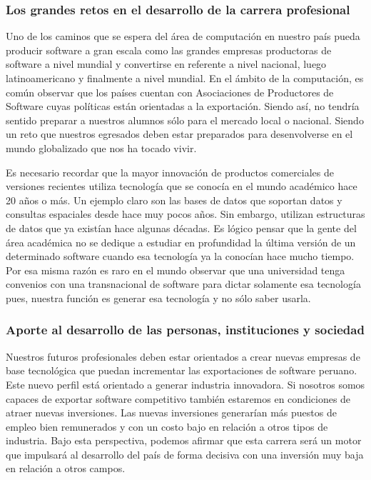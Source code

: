 \subsubsection{Los grandes retos en el desarrollo de la carrera profesional}
Uno de los caminos que se espera del área de computación en nuestro paí­s pueda producir software a gran escala como las 
grandes empresas productoras de software a nivel mundial y convertirse en referente a nivel nacional, luego latinoamericano y 
finalmente a nivel mundial. En el ámbito de la computación, es común observar que los paí­ses cuentan con
Asociaciones de Productores de Software cuyas polí­ticas están orientadas a la exportación. Siendo así­, 
no tendrí­a sentido preparar a nuestros alumnos sólo para el mercado local o nacional. 
Siendo un reto que nuestros egresados deben estar preparados para desenvolverse en el mundo globalizado que nos ha tocado vivir.

Es necesario recordar que la mayor innovación de productos comerciales de versiones recientes utiliza tecnologí­a que se conocí­a 
en el mundo académico hace 20 años o más. Un ejemplo claro son las bases de datos que soportan datos y consultas espaciales 
desde hace muy pocos años. Sin embargo, utilizan estructuras de datos que ya existí­an hace algunas décadas. 
Es lógico pensar que la gente del área académica no se dedique a estudiar en profundidad la última versión de un 
determinado software cuando esa tecnologí­a ya la conocí­an hace mucho tiempo. Por esa misma razón es raro en el 
mundo observar que una universidad tenga convenios con una transnacional de software para dictar solamente esa 
tecnologí­a pues, nuestra función es generar esa tecnologí­a y no sólo saber usarla.

\subsubsection{Aporte al desarrollo de las personas, instituciones y sociedad}
Nuestros futuros profesionales deben estar orientados a crear nuevas empresas de base tecnológica que puedan 
incrementar las exportaciones de software peruano. Este nuevo perfil está orientado a generar industria innovadora. 
Si nosotros somos capaces de exportar software competitivo también estaremos en condiciones de atraer nuevas inversiones. 
Las nuevas inversiones generarí­an más puestos de empleo bien remunerados y con un costo bajo en relación a otros tipos de industria. 
Bajo esta perspectiva, podemos afirmar que esta carrera será un motor que impulsará al desarrollo del paí­s de forma decisiva 
con una inversión muy baja en relación a otros campos.

